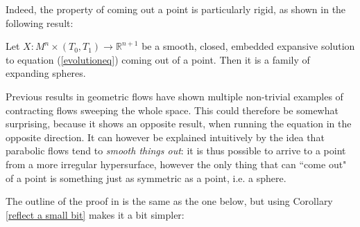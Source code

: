 Indeed, the property of coming out a point is particularly rigid, as shown in the following result:

\begin{theorem}
	Let $ X : M^n \times (T_0, T_1) \to \mathbb{R}^{n+1} $ be a smooth, closed, embedded expansive solution to equation (\ref{evolutioneq}) coming out of a point. Then it is a family of expanding spheres.
\end{theorem}

Previous results in geometric flows have shown multiple non-trivial examples of contracting flows sweeping the whole space.
This could therefore be somewhat surprising, because it shows an opposite result, when running the equation in the opposite direction. It can however be explained intuitively by the idea that parabolic flows tend to \textit{smooth things out}: it is thus possible to arrive to a point from a more irregular hypersurface, however the only thing that can ``come out" of a point is something just as symmetric as a point, i.e. a sphere. 

The outline of the proof in \cite{SinestRisa} is the same as the one below, but using Corollary \ref{reflect a small bit} makes it a bit simpler: 

